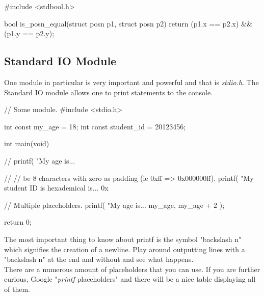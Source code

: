 \begin{code}[C]
#include <stdbool.h>

bool is_posn_equal(struct posn p1, struct posn p2)
{
	return (p1.x == p2.x) && (p1.y == p2.y);
}
\end{code}


\subsection{Standard IO Module}

One module in particular is very important and powerful and that is \emph{stdio.h}.  The Standard IO module allows one to print statements to the console.   


\begin{code}[C]
// Some module.
#include <stdio.h>

int const my_age = 18;
int const student_id = 20123456;

int main(void) 
{
	// %
	printf( "My age is... %
	
	// %
	// be 8 characters with zero as padding (ie 0xff => 0x000000ff).
	printf( "My student ID is hexademical is... 0x%
	
	// Multiple placeholders.
	printf( "My age is... %
	        my_age,
	        my_age + 2 );
	
	return 0;
}
\end{code}

The most important thing to know about printf is the symbol "backslash n" which signifies the creation of a newline.  Play around outputting lines with a "backslash n" at the end and without and see what happens.\\

There are a numerous amount of placeholders that you can use. If you are further curious, Google "\emph{printf} placeholders" and there will be a nice table displaying all of them.\\


